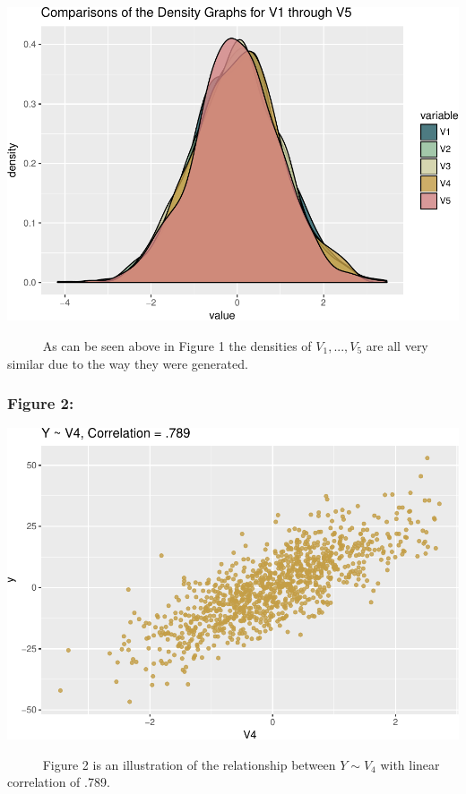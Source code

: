 \documentclass[12pt,twoside]{reedthesis}
\begin{document}
  \begin{center}\includegraphics{Thesis_files/figure-latex/fig1-1} \end{center}
  
  ~~~~~ As can be seen above in Figure 1 the densities of \(V_1,...,V_5\)
  are all very similar due to the way they were generated.
  
  \subsubsection{Figure 2:}\label{figure-2}
  
  \begin{center}\includegraphics{Thesis_files/figure-latex/fig2-1} \end{center}
  
  ~~~~~ Figure 2 is an illustration of the relationship between
  \(Y\sim V_4\) with linear correlation of .789.
  
\end{document}
